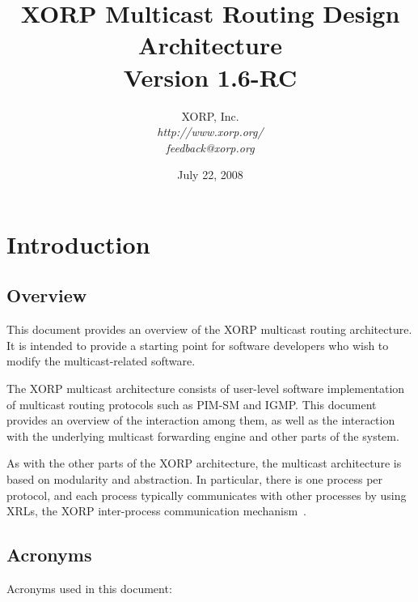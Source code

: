 \documentclass[11pt]{article}
\begin{document}
\title{XORP Multicast Routing Design Architecture \\
\vspace{1ex}
Version 1.6-RC}
\author{ XORP, Inc.					\\
         {\it http://www.xorp.org/}			\\
	 {\it feedback@xorp.org}
}
\date{July 22, 2008}

\maketitle


\section{Introduction}


\subsection{Overview}

This document provides an overview of the XORP multicast routing
architecture.  It is intended to provide a starting point for software
developers who wish to modify the multicast-related software.

The XORP multicast architecture consists of user-level software
implementation of multicast routing protocols such as PIM-SM and IGMP.
This document provides an overview of the interaction among them,
as well as the interaction with the underlying multicast forwarding
engine and other parts of the system.

As with the other parts of the XORP architecture, the multicast
architecture is based on modularity and abstraction.
In particular, there is one process per protocol, and each process
typically communicates with other processes by using XRLs, the XORP
inter-process communication mechanism~\cite{xorp:xrl}.

\subsection{Acronyms}

Acronyms used in this document:
\end{document}
